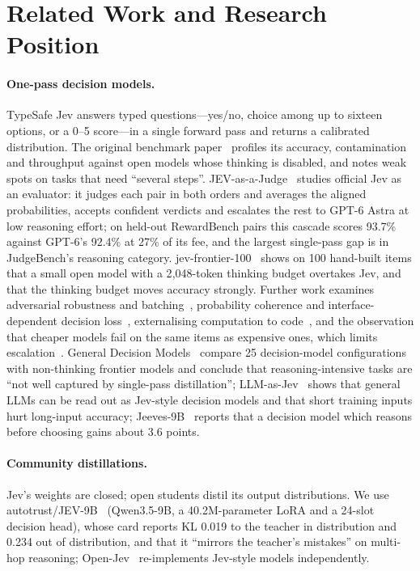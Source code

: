 \section{Related Work and Research Position}
\label{sec:related}

\paragraph{One-pass decision models.}
TypeSafe Jev answers typed questions---yes/no, choice among up to sixteen options, or a 0--5 score---in a single forward pass and returns a calibrated distribution.
The original benchmark paper~\citep{jevbench2026} profiles its accuracy, contamination and throughput against open models whose thinking is disabled, and notes weak spots on tasks that need ``several steps''.
JEV-as-a-Judge~\citep{jevjudge2026} studies official Jev as an evaluator: it judges each pair in both orders and averages the aligned probabilities, accepts confident verdicts and escalates the rest to GPT-6 Astra at low reasoning effort; on held-out RewardBench pairs this cascade scores 93.7\% against GPT-6's 92.4\% at 27\% of its fee, and the largest single-pass gap is in JudgeBench's reasoning category.
jev-frontier-100~\citep{jevfrontier100} shows on 100 hand-built items that a small open model with a 2{,}048-token thinking budget overtakes Jev, and that the thinking budget moves accuracy strongly.
Further work examines adversarial robustness and batching~\citep{jevadvbench2026}, probability coherence and interface-dependent decision loss~\citep{probcontracts2026,addup2026,beyondcal2026}, externalising computation to code~\citep{codeownssim2026}, and the observation that cheaper models fail on the same items as expensive ones, which limits escalation~\citep{samewrong2026}.
General Decision Models~\citep{gdm2026} compare 25 decision-model configurations with non-thinking frontier models and conclude that reasoning-intensive tasks are ``not well captured by single-pass distillation''; LLM-as-Jev~\citep{llmasjev2026} shows that general LLMs can be read out as Jev-style decision models and that short training inputs hurt long-input accuracy; Jeeves-9B~\citep{jeeves2026} reports that a decision model which reasons before choosing gains about 3.6 points.

\paragraph{Community distillations.}
Jev's weights are closed; open students distil its output distributions.
We use autotrust/JEV-9B~\citep{jev9bcard} (Qwen3.5-9B, a 40.2M-parameter LoRA and a 24-slot decision head), whose card reports KL 0.019 to the teacher in distribution and 0.234 out of distribution, and that it ``mirrors the teacher's mistakes'' on multi-hop reasoning; Open-Jev~\citep{openjev} re-implements Jev-style models independently.

